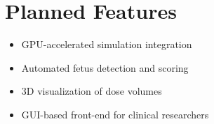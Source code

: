 \documentclass[11pt]{article}
\begin{document}
\section{Planned Features}

\begin{itemize}
    \item GPU-accelerated simulation integration
    \item Automated fetus detection and scoring
    \item 3D visualization of dose volumes
    \item GUI-based front-end for clinical researchers
\end{itemize}



\end{document}
